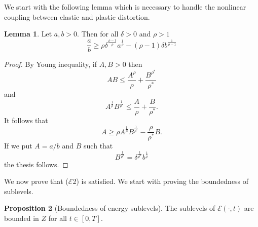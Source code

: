 \documentclass[a4paper,10pt,oneside]{amsbook}
\numberwithin{section}{chapter}
\numberwithin{equation}{chapter}
\theoremstyle{definition}
\newtheorem{prop}{Proposition}[chapter]
\newtheorem{lemma}[prop]{Lemma}
\begin{document}
We start with the following lemma which is necessary to handle the nonlinear coupling between elastic and plastic distortion.
\begin{lemma}
\label{lemma:inverse-young}
Let $a,b>0$. Then for all $\delta>0$ and $\rho>1$
\[
\frac{a}{b}\ge\rho\delta^\frac{\rho-1}{\rho}a^\frac{1}{\rho}-(\rho-1)\delta b^\frac{1}{\rho-1}
\]
\end{lemma}
\begin{proof}
By Young inequality, if $A,B>0$ then
\[
AB\le\frac{A^\rho}{\rho}+\frac{B^{\rho^*}}{\rho^*}
\]
and
\[
A^\frac{1}{\rho}B^\frac{1}{\rho^*}\le\frac{A}{\rho}+\frac{B}{\rho^*}.
\]
It follows that
\[
A\ge\rho A^\frac{1}{\rho}B^\frac{1}{\rho^*}-\frac{\rho}{\rho^*}B.
\]
If we put $A=a/b$ and $B$ such that
\[
B^\frac{1}{\rho^*}=\delta^\frac{1}{\rho^*}b^\frac{1}{\rho}
\]
the thesis follows.
\end{proof}
We now prove that ($\mathcal{E}$2) is satisfied. We start with proving the boundedness of sublevels.
\begin{prop}[Boundedness of energy sublevels]
The sublevels of $\mathcal{E}(\cdot,t)$ are bounded in $Z$ for all $t\in[0,T]$.
\end{prop}
\end{document}
